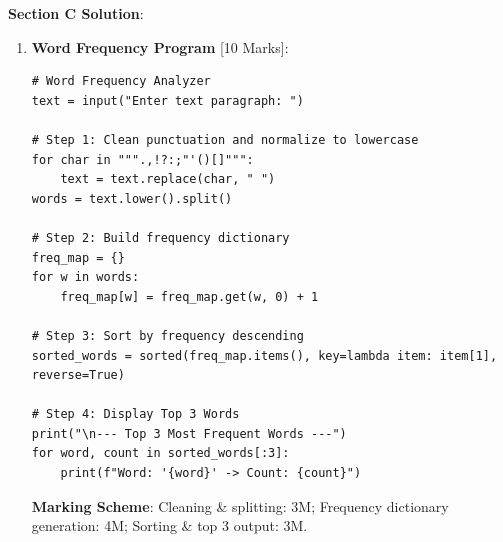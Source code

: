 \begin{solutionbox}
\noindent\textbf{Section C Solution}:
\begin{enumerate}[start=7]
    \item \textbf{Word Frequency Program} [10 Marks]:
\begin{lstlisting}[language=Python3]
# Word Frequency Analyzer
text = input("Enter text paragraph: ")

# Step 1: Clean punctuation and normalize to lowercase
for char in """.,!?:;"'()[]""":
    text = text.replace(char, " ")
words = text.lower().split()

# Step 2: Build frequency dictionary
freq_map = {}
for w in words:
    freq_map[w] = freq_map.get(w, 0) + 1

# Step 3: Sort by frequency descending
sorted_words = sorted(freq_map.items(), key=lambda item: item[1], reverse=True)

# Step 4: Display Top 3 Words
print("\n--- Top 3 Most Frequent Words ---")
for word, count in sorted_words[:3]:
    print(f"Word: '{word}' -> Count: {count}")
\end{lstlisting}
\textbf{Marking Scheme}: Cleaning \& splitting: 3M; Frequency dictionary generation: 4M; Sorting \& top 3 output: 3M.
\end{enumerate}
\end{solutionbox}
